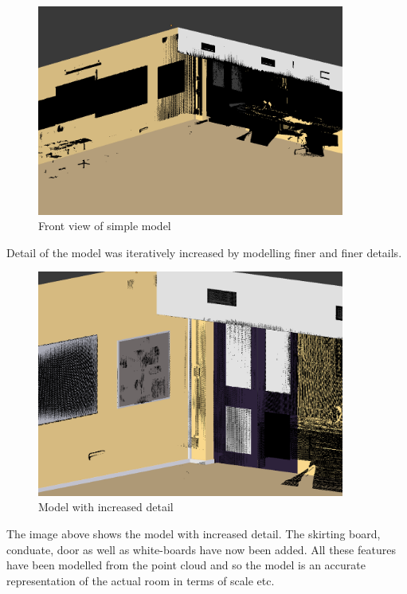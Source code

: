 \documentclass[11pt,a4paper]{report}
\begin{document}
				\begin{figure}[h!]
					\centering
					\includegraphics[width=0.9\textwidth]{simple_model_with_pc}
					\caption{Front view of simple model}
				\end{figure}
				
				Detail of the model was iteratively increased by modelling finer and finer details.
				
				\begin{figure}[h!]
					\centering
					\includegraphics[width=0.9\textwidth]{model_with_increased_detail}
					\caption{Model with increased detail}
				\end{figure}
				
				The image above shows the model with increased detail. The skirting board, conduate, door as well as white-boards have now been added. All these features have been modelled from the point cloud and so the model is an accurate representation of the actual room in terms of scale etc.
				
\end{document}
